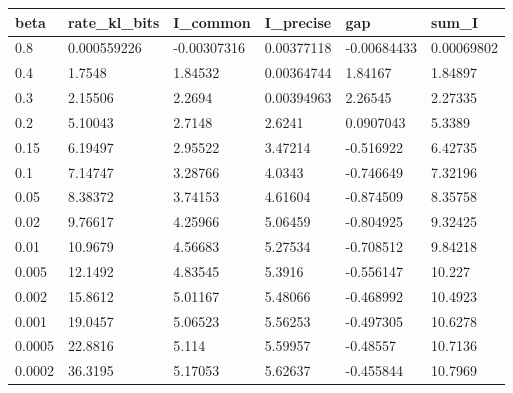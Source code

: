 \begin{tabular}{llllll}
\toprule
beta & rate\_kl\_bits & I\_common & I\_precise & gap & sum\_I \\
\midrule
0.8 & 0.000559226 & -0.00307316 & 0.00377118 & -0.00684433 & 0.00069802 \\
0.4 & 1.7548 & 1.84532 & 0.00364744 & 1.84167 & 1.84897 \\
0.3 & 2.15506 & 2.2694 & 0.00394963 & 2.26545 & 2.27335 \\
0.2 & 5.10043 & 2.7148 & 2.6241 & 0.0907043 & 5.3389 \\
0.15 & 6.19497 & 2.95522 & 3.47214 & -0.516922 & 6.42735 \\
0.1 & 7.14747 & 3.28766 & 4.0343 & -0.746649 & 7.32196 \\
0.05 & 8.38372 & 3.74153 & 4.61604 & -0.874509 & 8.35758 \\
0.02 & 9.76617 & 4.25966 & 5.06459 & -0.804925 & 9.32425 \\
0.01 & 10.9679 & 4.56683 & 5.27534 & -0.708512 & 9.84218 \\
0.005 & 12.1492 & 4.83545 & 5.3916 & -0.556147 & 10.227 \\
0.002 & 15.8612 & 5.01167 & 5.48066 & -0.468992 & 10.4923 \\
0.001 & 19.0457 & 5.06523 & 5.56253 & -0.497305 & 10.6278 \\
0.0005 & 22.8816 & 5.114 & 5.59957 & -0.48557 & 10.7136 \\
0.0002 & 36.3195 & 5.17053 & 5.62637 & -0.455844 & 10.7969 \\
\bottomrule
\end{tabular}
